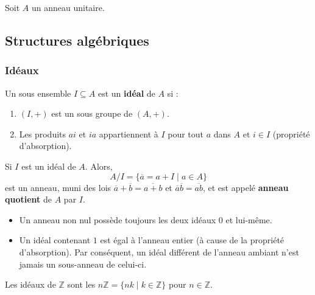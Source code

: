 




  Soit $A$ un anneau unitaire.

  \subsection{Structures algébriques}

  \subsubsection{Idéaux}


  \begin{definition}
    Un sous ensemble $I \subseteq A$ est un \textbf{idéal} de $A$ si :
    \begin{enumerate}[label={\bfseries(\roman*)}]
      \item $(I,+)$ est un sous groupe de $(A,+)$.
      \item Les produits $ai$ et $ia$ appartiennent à $I$ pour tout $a$ dans $A$ et $i \in I$ (propriété d'absorption).
    \end{enumerate}
    Si $I$ est un idéal de $A$. Alors,
    \[ A/I = \{ \overline{a} = a + I \mid a \in A \} \]
    est un anneau, muni des lois $\overline{a} + \overline{b} = \overline{a+b}$ et $\overline{a} \overline{b} = \overline{ab}$, et est appelé \textbf{anneau quotient} de $A$ par $I$.
  \end{definition}


  \begin{remark}
    \begin{itemize}
      \item Un anneau non nul possède toujours les deux idéaux ${0}$ et lui-même.
      \item Un idéal contenant $1$ est égal à l'anneau entier (à cause de la propriété d'absorption). Par conséquent, un idéal différent de l'anneau ambiant n'est jamais un sous-anneau de celui-ci.
    \end{itemize}
  \end{remark}

  \begin{example}
    \label{122-1}
    Les idéaux de $\mathbb{Z}$ sont les $n\mathbb{Z} = \{ nk \mid k \in \mathbb{Z} \}$ pour $n \in \mathbb{Z}$.
  \end{example}

